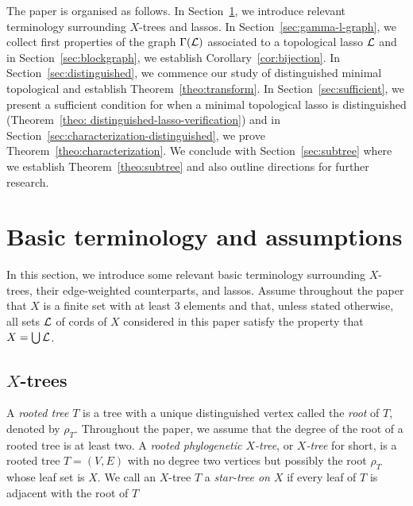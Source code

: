 
The paper is organised as follows. In Section~\ref{sec:terminology}, we
introduce relevant terminology surrounding $X$-trees and lassos. In
Section~\ref{sec:gamma-l-graph}, we collect first properties of the graph
$\Gamma({\mathcal L})$ associated to a topological lasso ${\mathcal L}$ and in
Section~\ref{sec:blockgraph}, we establish Corollary~\ref{cor:bijection}. In
Section~\ref{sec:distinguished}, we commence our study of distinguished
minimal topological and establish Theorem~\ref{theo:transform}. In
Section~\ref{sec:sufficient}, we present a sufficient condition for when a
minimal topological lasso is distinguished (Theorem~\ref{theo:
  distinguished-lasso-verification}) and in
Section~\ref{sec:characterization-distinguished}, we prove
Theorem~\ref{theo:characterization}. We conclude with
Section~\ref{sec:subtree} where we establish Theorem~\ref{theo:subtree} and
also outline directions for further research.


\section{Basic terminology and assumptions}\label{sec:terminology}
In this section, we introduce some relevant basic terminology surrounding
$X$-trees, their edge-weighted counterparts, and lassos.  Assume throughout
the paper that $X$ is a finite set with at least 3 elements and that, unless
stated otherwise, all sets ${\mathcal L}$ of cords of $X$ considered in this paper
satisfy the property that
$X=\bigcup {\mathcal L}$. 


\subsection{$X$-trees}
A {\em rooted tree} $T$ is a tree with a unique distinguished vertex called
the {\em root} of $T$, denoted by $\rho_T$. Throughout the paper, we assume
that the degree of the root of a rooted tree is at least two.  A {\em rooted
  phylogenetic $X$-tree}, or {\em $X$-tree} for short, is a rooted tree
$T=(V,E)$ with no degree two vertices but possibly the root $\rho_T$ whose
leaf set is $X$. We call an $X$-tree $T$ a {\em star-tree on $X$} if every
leaf of $T$ is adjacent with the root of $T$

